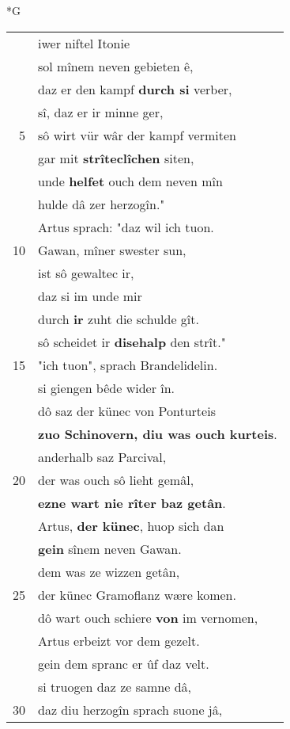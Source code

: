 \documentclass[8pt,a4paper,notitlepage]{article}
\begin{document}
\begin{table}[ht]
\begin{minipage}[t]{0.5\linewidth}
\small
\begin{center}*G
\end{center}
\begin{tabular}{rl}
 & iwer niftel Itonie\\ 
 & sol mînem neven gebieten ê,\\ 
 & daz er den kampf \textbf{durch si} verber,\\ 
 & sî, daz er ir minne ger,\\ 
5 & sô wirt vür wâr der kampf vermiten\\ 
 & gar mit \textbf{strîteclîchen} siten,\\ 
 & unde \textbf{helfet} ouch dem neven mîn\\ 
 & hulde dâ zer herzogîn."\\ 
 & Artus sprach: "daz wil ich tuon.\\ 
10 & Gawan, mîner swester sun,\\ 
 & ist sô gewaltec ir,\\ 
 & daz si im unde mir\\ 
 & durch \textbf{ir} zuht die schulde gît.\\ 
 & sô scheidet ir \textbf{disehalp} den strît."\\ 
15 & "ich tuon", sprach Brandelidelin.\\ 
 & si giengen bêde wider în.\\ 
 & dô saz der künec von Ponturteis\\ 
 & \textbf{zuo Schinovern, diu was ouch kurteis}.\\ 
 & anderhalb saz Parcival,\\ 
20 & der was ouch sô lieht gemâl,\\ 
 & \textbf{ezne wart nie rîter baz getân}.\\ 
 & Artus, \textbf{der künec}, huop sich dan\\ 
 & \textbf{gein} sînem neven Gawan.\\ 
 & dem was ze wizzen getân,\\ 
25 & der künec Gramoflanz wære komen.\\ 
 & dô wart ouch schiere \textbf{von} im vernomen,\\ 
 & Artus erbeizt vor dem gezelt.\\ 
 & gein dem spranc er ûf daz velt.\\ 
 & si truogen daz ze samne dâ,\\ 
30 & daz diu herzogîn sprach suone jâ,\\ 

\end{tabular}
\end{minipage}
\end{table}
\end{document}
